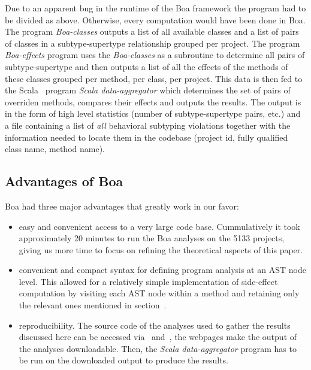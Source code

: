 \documentclass{acm_proc_article-sp}
\begin{document}
Due to an apparent bug in the runtime of the Boa framework the program had to be divided as above. Otherwise, every computation would have been done in Boa. The program \emph{Boa-classes} outputs a list of all available classes and a list of pairs of classes in a subtype-supertype relationship grouped per project. The program \emph{Boa-effects} program uses the \emph{Boa-classes} as a subroutine to determine all pairs of subtype-supertype and then outputs a list of all the effects of the methods of these classes grouped per method, per class,  per project. This data is then fed to the Scala~\cite{odersky2004overview} program \emph{Scala data-aggregator} which determines the set of pairs of overriden methods, compares their effects and outputs the results. The output is in the form of high level statistics (number of subtype-supertype pairs, etc.) and a file containing a list of \emph{all} behavioral subtyping violations together with the information needed to locate them in the codebase (project id, fully qualified class name, method name).

\subsection{Advantages of Boa}
Boa had three major advantages that greatly work in our favor:
\begin{itemize}
\item easy and convenient access to a very large code base. Cummulatively it took approximately 20 minutes to run the Boa analyses on the 5133 projects, giving us more time to focus on refining the theoretical aspects of this paper.
\item convenient and compact syntax for defining program analysis at an AST node level. This allowed for a relatively simple implementation of side-effect computation by visiting each AST node within a method and retaining only the relevant ones mentioned in section~\cite{definition:side-effects}.
\item reproducibility. The source code of the analyses used to gather the results discussed here can be accessed via~\cite{boa-classes} and~\cite{boa-effects}, the webpages make the output of the analyses downloadable. Then, the \emph{Scala data-aggregator} program has to be run on the downloaded output to produce the results.
\end{itemize}
\end{document}
